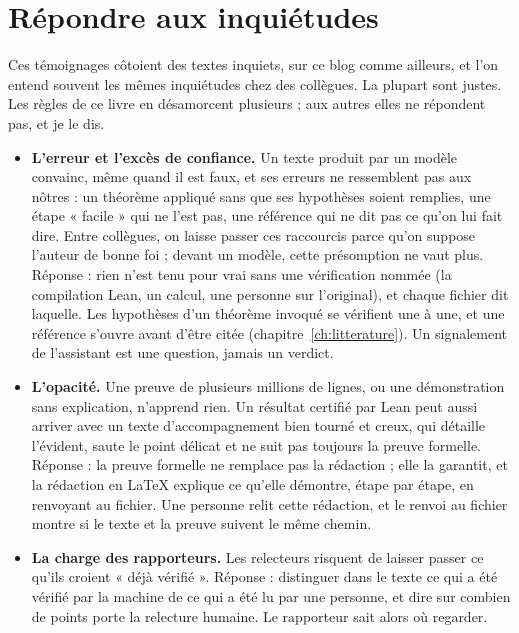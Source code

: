 \section{Répondre aux inquiétudes}

Ces témoignages côtoient des textes inquiets, sur ce blog comme ailleurs, et l'on entend
souvent les mêmes inquiétudes chez des collègues. La plupart sont justes. Les règles de ce
livre en désamorcent plusieurs ; aux autres elles ne répondent pas, et je le dis.

\begin{itemize}
  \item \textbf{L'erreur et l'excès de confiance.} Un texte produit par un modèle convainc,
        même quand il est faux, et ses erreurs ne ressemblent pas aux nôtres : un théorème
        appliqué sans que ses hypothèses soient remplies, une étape « facile » qui ne l'est
        pas, une référence qui ne dit pas ce qu'on lui fait dire. Entre collègues, on
        laisse passer ces raccourcis parce qu'on suppose l'auteur de bonne foi ; devant un
        modèle, cette présomption ne vaut plus.
        Réponse : rien n'est tenu pour vrai sans une vérification nommée (la compilation
        Lean, un calcul, une personne sur l'original), et chaque fichier dit laquelle. Les
        hypothèses d'un théorème invoqué se vérifient une à une, et une référence s'ouvre
        avant d'être citée (chapitre~\ref{ch:litterature}). Un signalement de l'assistant
        est une question, jamais un verdict.
  \item \textbf{L'opacité.} Une preuve de plusieurs millions de lignes, ou une démonstration sans
        explication, n'apprend rien. Un résultat certifié par Lean peut aussi arriver avec
        un texte d'accompagnement bien tourné et creux, qui détaille l'évident, saute le
        point délicat et ne suit pas toujours la preuve formelle. Réponse : la preuve
        formelle ne remplace pas la rédaction ; elle la garantit, et la rédaction en LaTeX
        explique ce qu'elle démontre, étape par étape, en renvoyant au fichier. Une
        personne relit cette rédaction, et le renvoi au fichier montre si le texte et la
        preuve suivent le même chemin.
  \item \textbf{La charge des rapporteurs.} Les relecteurs risquent de laisser passer ce qu'ils
        croient « déjà vérifié ». Réponse : distinguer dans le texte ce qui a été vérifié
        par la machine de ce qui a été lu par une personne, et dire sur combien de points
        porte la relecture humaine. Le rapporteur sait alors où regarder.

\end{itemize}
